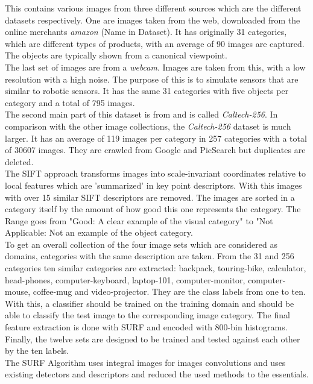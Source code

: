 This contains various images from three different sources which are the different datasets respectively.
One are images taken from the web, downloaded from the online merchants \textit{amazon} (Name in Dataset).
It has originally 31 categories, which are different types of products, with an average of 90 images are captured.
The objects are typically shown from a canonical viewpoint.\cite{Saenko.2010}\\
The last set of images are from a \textit{webcam}.
Images are taken from this, with a low resolution with a high noise. The purpose of this is to simulate sensors that are similar to robotic sensors.
It has the same 31 categories with five objects per category and a total of 795 images. \\
The second main part of this dataset is from \cite{GregGriffin.} and is called \textit{Caltech-256}. In comparison with the other image collections, the \textit{Caltech-256} dataset is much larger.
It has an average of 119 images per category in 257 categories with a total of 30607 images.
They are crawled from Google and PicSearch but duplicates are deleted.\cite{GregGriffin.}\\
The \ac{SIFT} approach transforms images into scale-invariant coordinates relative to local features which are 'summarized' in key point descriptors.\cite{Lowe.2004}
With this images with over 15 similar \acs{SIFT} descriptors are removed.
The images are sorted in a category itself by the amount of how good this one represents the category.
The Range goes from "Good: A clear example of the visual category" to "Not Applicable: Not an example of the object category.\cite[p.3]{GregGriffin.}\\
To get an overall collection of the four image sets which are considered as domains, categories with the same description are taken.
From the 31 and 256 categories ten similar categories are extracted:
backpack, touring-bike, calculator, head-phones, computer-keyboard, laptop-101, computer-monitor, computer-mouse, coffee-mug and video-projector.
They are the class labels from one to ten. 
With this, a classifier should be trained on the training domain and should be able to classify the test image to the corresponding image category.
The final feature extraction is done with \ac{SURF} and encoded with 800-bin histograms.
Finally, the twelve sets are designed to be trained and tested against each other by the ten labels.\cite{Gong.} \\
The \ac{SURF} Algorithm uses integral images for images convolutions and uses existing detectors and descriptors and reduced the used methods to the essentials. \cite{vanBay.2006} 
